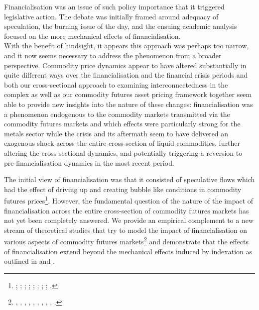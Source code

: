 \documentclass[
  authoryear,
  preprint,
  3p]{elsarticle}
\begin{document}
\bigskip
\bigskip

Financialisation was an issue of such policy importance that it
triggered legislative action. The debate was initially framed around
adequacy of speculation, the burning issue of the day, and the ensuing
academic analysis focused on the more mechanical effects of
financialisation.\\
With the benefit of hindsight, it appears this approach was perhaps too
narrow, and it now seems necessary to address the phenomenon from a
broader perspective. Commodity price dynamics appear to have altered
substantially in quite different ways over the financialisation and the
financial crisis periods and both our cross-sectional approach to
examining interconnectedness in the complex as well as our commodity
futures asset pricing framework together seem able to provide new
insights into the nature of these changes: financialisation was a
phenomenon endogenous to the commodity markets transmitted via the
commodity futures markets and which effects were particularly strong for
the metals sector while the crisis and its aftermath seem to have
delivered an exogenous shock across the entire cross-section of liquid
commodities, further altering the cross-sectional dynamics, and
potentially triggering a reversion to pre-financialisation dynamics in
the most recent period.

The initial view of financialisation was that it consisted of
speculative flows which had the effect of driving up and creating bubble
like conditions in commodity futures prices\footnote{\citet{masters_testimony_2008};
  \citet{masters_accidental_2008}; \citet{unctad_global_2009};
  \citet{deschutter_food_2010}; \citet{gilbert_how_2010};
  \citet{gilbert_speculative_2010}; \citet{herman_not_2011};
  \citet{schumann_hunger_2011}; \citet{singleton_investor_2013}.}.
However, the fundamental question of the nature of the impact of
financialisation across the entire cross-section of commodity futures
markets has not yet been completely answered. We provide an empirical
complement to a new stream of theoretical studies that try to model the
impact of financialisation on various aspects of commodity futures
markets\footnote{\citet{etula_broker-dealer_2013},
  \citet{acharya_limits_2013}, \citet{cheng_convective_2014},
  \citet{leclercq_equilibrium_2014}, \citet{sockin_informational_2015},
  \citet{goldstein_speculation_2014}, \citet{ekeland_speculation_2016},
  \citet{goldstein_commodity_2022}, \citet{ekeland_hedging_2019},
  \citet{isleimeyyeh_role_2020}.} and demonstrate that the effects of
financialisation extend beyond the mechanical effects induced by
indexation as outlined in \citet{tang_index_2012} and
\citet{basak_model_2016}.
\end{document}
